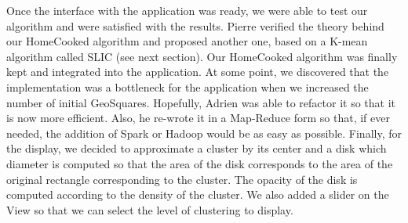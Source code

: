 Once the interface with the application was ready, we were able to test our algorithm and were satisfied with the results. 
Pierre verified the theory behind our HomeCooked algorithm and proposed another one, based on a K-mean algorithm called SLIC (see next section).
Our HomeCooked algorithm was finally kept and integrated into the application. At some point, we discovered that the implementation was a bottleneck for the application when we increased the number of initial GeoSquares. Hopefully, Adrien was able to refactor it so that it is now more efficient. Also, he re-wrote it in a Map-Reduce form so that, if ever needed, the addition of Spark or Hadoop would be as easy as possible. 
Finally, for the display, we decided to approximate a cluster by its center and a disk which diameter is computed so that the area of the disk corresponds to the area of the original rectangle corresponding to the cluster. The opacity of the disk is computed according to the density of the cluster. We also added a slider on the View so that we can select the level of clustering to display.        